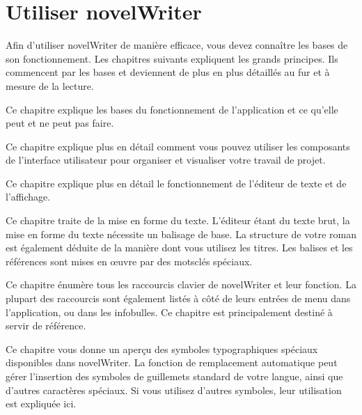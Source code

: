 \documentclass[a4paper,11pt,french]{sphinxmanual}
\begin{document}
\section{Utiliser novelWriter}
\label{\detokenize{int_overview:using-novelwriter}}
\sphinxAtStartPar
Afin d’utiliser novelWriter de manière efficace, vous devez connaître les bases de son fonctionnement. Les chapitres suivants expliquent les grands principes. Ils commencent par les bases et deviennent de plus en plus détaillés au fur et à mesure de la lecture.
\begin{description}
\sphinxAtStartPar
Ce chapitre explique les bases du fonctionnement de l’application et ce qu’elle peut et ne peut pas faire.

\sphinxAtStartPar
Ce chapitre explique plus en détail comment vous pouvez utiliser les composants de l’interface utilisateur pour organiser et visualiser votre travail de projet.

\sphinxAtStartPar
Ce chapitre explique plus en détail le fonctionnement de l’éditeur de texte et de l’affichage.

\sphinxAtStartPar
Ce chapitre traite de la mise en forme du texte. L’éditeur étant du texte brut, la mise en forme du texte nécessite un balisage de base. La structure de votre roman est également déduite de la manière dont vous utilisez les titres. Les balises et les références sont mises en œuvre par des mots\sphinxhyphen{}clés spéciaux.

\sphinxAtStartPar
Ce chapitre énumère tous les raccourcis clavier de novelWriter et leur fonction. La plupart des raccourcis sont également listés à côté de leurs entrées de menu dans l’application, ou dans les info\sphinxhyphen{}bulles. Ce chapitre est principalement destiné à servir de référence.

\sphinxAtStartPar
Ce chapitre vous donne un aperçu des symboles typographiques spéciaux disponibles dans novelWriter. La fonction de remplacement automatique peut gérer l’insertion des symboles de guillemets standard de votre langue, ainsi que d’autres caractères spéciaux. Si vous utilisez d’autres symboles, leur utilisation est expliquée ici.

\end{description}
\end{document}
